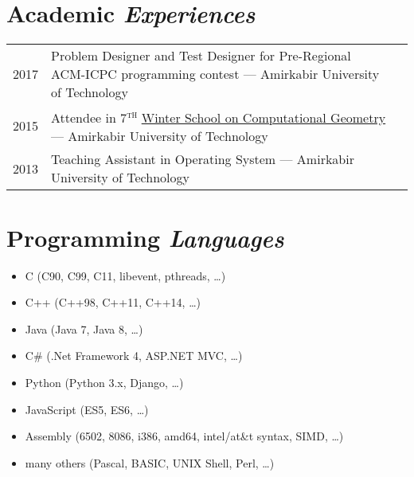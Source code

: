 \documentclass[a4paper,10pt]{article}
\newcommand{\supersc}[1]{\textsuperscript{\textsc{#1}}}
\newcommand{\follownote}[1]{--- {\footnotesize\color{darkblue}#1}}
\begin{document}
\section*{{\color{green}Academic \emph{Experiences}}}
\begin{tabular}{p{1cm}lN}

2017 & \parbox[t]{11cm}{
	Problem Designer and Test Designer for Pre-Regional ACM-ICPC
	programming contest
	\follownote{Amirkabir University of Technology}
} &\\[5mm]

2015 & \parbox[t]{11cm}{
	Attendee in 7\supersc{th} \href{http://wscg.aut.ac.ir}
	{Winter School on Computational Geometry}
	\follownote{Amirkabir University of Technology}
} &\\[5mm]

2013 & \parbox[t]{11cm}{
	Teaching Assistant in Operating System
	\follownote{Amirkabir University of Technology}
} &\\[5mm]

\end{tabular}

\section*{{\color{purple}Programming \emph{Languages}}}
\begin{itemize}
	\item C (C90, C99, C11, libevent, pthreads, \ldots)
	\item C++ (C++98, C++11, C++14, \ldots)
	\item Java (Java 7, Java 8, \ldots)
	\item C\# (.Net Framework 4, ASP.NET MVC, \ldots)
	\item Python (Python 3.x, Django, \ldots)
	\item JavaScript (ES5, ES6, \ldots)
	\item Assembly (6502, 8086, i386, amd64, intel/at\&t syntax,
	    SIMD, \ldots)
	\item many others (Pascal, BASIC, UNIX Shell, Perl, \ldots)
\end{itemize}
\end{document}
